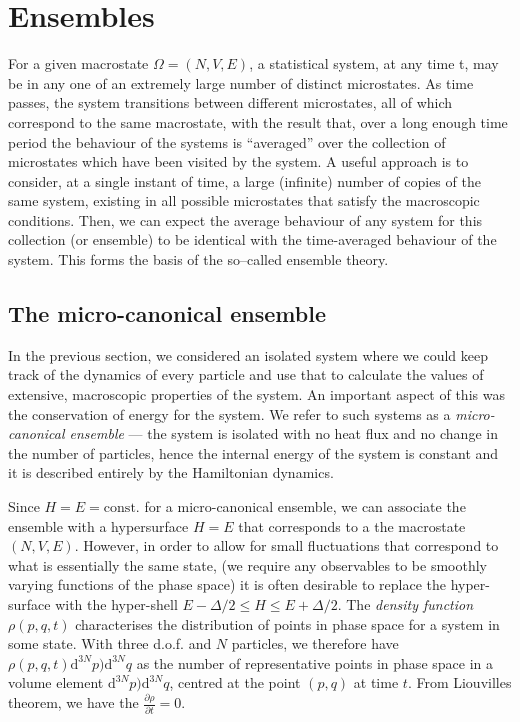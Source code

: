 \section{Ensembles}

For a given macrostate $\Omega=(N, V, E)$, a statistical system, at any time t, may be in any one of an extremely large number of distinct microstates. As time passes, the system transitions between different microstates, all of which correspond to the same macrostate, with the result that, over a long enough time period the behaviour of the systems is ``averaged'' over the collection of microstates which have been visited by the system.
A useful approach is to consider, at a single instant of time, a large (infinite) number of copies of the same system, existing in all possible microstates that satisfy the macroscopic conditions. Then, we can expect the average behaviour of any system for this collection (or ensemble) to be identical with the time-averaged behaviour of the system. This forms the basis of the so–called ensemble theory.

\subsection{The micro-canonical ensemble}
In the previous section, we considered an isolated system where we could keep track of the dynamics of every particle and use that to calculate the values of extensive, macroscopic properties of the system. An important aspect of this was the conservation of energy for the system. We refer to such systems as a \emph{micro-canonical ensemble} --- the system is isolated with no heat flux and no change in the number of particles, hence the internal energy of the system is constant and it is described entirely by the Hamiltonian dynamics.

Since $H=E=\mbox{const.}$ for a micro-canonical ensemble, we can associate the ensemble with a hypersurface $H=E$ that corresponds to a the macrostate $(N,V,E)$. However, in order to allow for small fluctuations that correspond to what is essentially the same state, (we require any observables to be smoothly varying functions of the phase space) it is often desirable to replace the hyper-surface with the hyper-shell $E-\Delta/2 \leq H \leq E+\Delta/2$. The \emph{density function} $\rho(p,q,t)$ characterises the distribution of points in phase space for a system in some state. With three d.o.f. and $N$ particles, we therefore have $\rho(p,q,t)\mathrm{d}^{3N}p)\mathrm{d}^{3N}q$ as the number of representative points in phase space in a volume element $\mathrm{d}^{3N}p)\mathrm{d}^{3N}q$, centred at the point $(p,q)$ at time $t$. From Liouvilles theorem, we have the $\frac{\partial \rho}{\partial t}=0$. 

